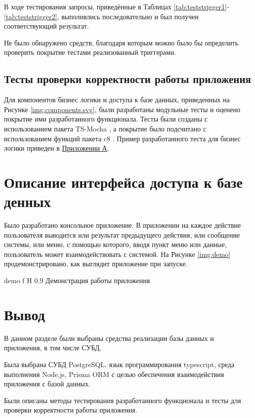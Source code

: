 В ходе тестирования запросы, приведённые в Таблицах \ref{tab:teststrigger1}-\ref{tab:teststrigger2}, выполнялись последовательно и был получен соответствующий результат. 

Не было обнаружено средств, благодаря которым можно было бы определить проверить покрытие тестами реализованный триггерами.

\subsection{Тесты проверки корректности работы приложения}

Для компонентов бизнес логики и доступа к базе данных, приведенных на Рисунке \ref{img:components.svg}, были разработаны модульные тесты и оценено покрытие ими разработанного функционала. Тесты были созданы с использованием пакета TS-Mocha \cite{mocha}, а покрытие было подсчитано с использованием функций пакета c8 \cite{c8}. 
Пример разработанного теста для бизнес логики приведен в \hyperref[chp:Appendix1]{Приложении А}.

\section{Описание интерфейса доступа к базе денных}

Было разработано консольное приложение. 
В приложении на каждое действие пользователя выводится или результат предыдущего действия, или сообщение системы, или меню, с помощью которого, вводя пункт меню или данные, пользователь может взаимодействовать с системой.
На Рисунке \ref{img:demo} продемонстрировано, как выглядит приложение при запуске.

{demo}
{f}
{H}
{0.9\textwidth}
{Демонстрация работы приложения}

\section*{Вывод}

В данном разделе были выбраны средства реализации базы данных и приложения, в том числе СУБД. 

Была выбрана СУБД  PostgreSQL, язык программирования typescript, среда выполнения Node.js, Prisma ORM с целью обеспечения взаимодействия приложения с базой данных.

Были описаны методы тестирования разработанного функционала и тесты для проверки корректности работы приложения.